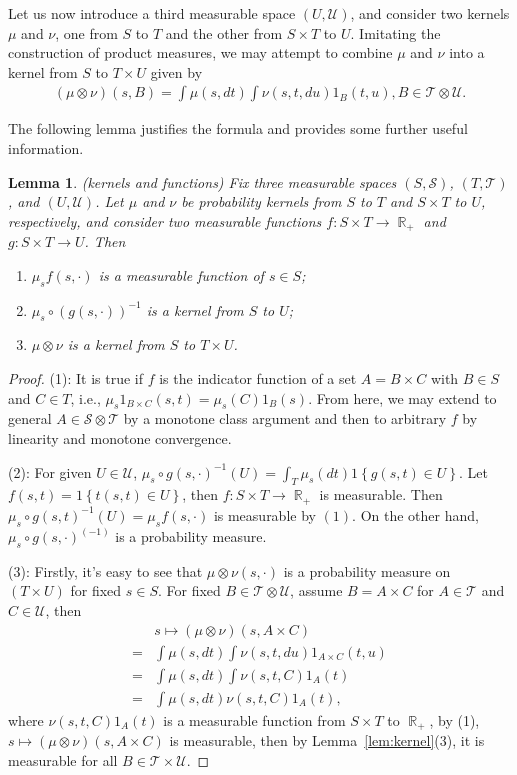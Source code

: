 \documentclass[12pt,a4paper]{article}
\newcommand{\R}{\mathop{\mathbb{R}}}
\def \U {\mathbf{U}}
\def \U {\mathcal{U}}
\def \S {\mathcal{S}}
\def \T {\mathcal{T}}
\newtheorem{lemma}[theorem]{Lemma}
\begin{document}
Let us now introduce a third measurable space $(U,\U)$, and consider two kernels $\mu$ and $\nu$, one from $S$ to $T$ and the other from $S\times T$ to $U$. Imitating the construction of product measures, we may attempt to combine $\mu$ and $\nu$ into a kernel from $S$ to $T\times U$ given by
\begin{align*}
  (\mu\otimes \nu)(s,B) = \int \mu(s,dt) \int \nu(s,t, du) 1_B(t,u), B \in \T\otimes \U.
\end{align*}

The following lemma justifies the formula and provides some further useful information.
\begin{lemma}
  (kernels and functions) Fix three measurable spaces $(S,\S)$, $(T,\T)$, and $(U,\U)$. Let $\mu$ and $\nu$ be probability kernels from $S$ to $T$ and $S\times T$ to $U$, respectively, and consider two measurable functions $f:S\times T\to \R_+$ and $g:S\times T\to U$. Then
  \begin{enumerate}
    \item $\mu_sf(s,\cdot)$ is a measurable function of $s\in S$;
    \item $\mu_s \circ (g(s,\cdot))^{-1}$ is a kernel from $S$ to $U$;
      \item $\mu\otimes \nu$ is a kernel from $S$ to $T\times U$.
  \end{enumerate}
  \label{lem:kernel&function}
\end{lemma}
\begin{proof}
  (1): It is true if $f $ is the indicator function of a set $A=B\times C$ with $B\in S$ and $C\in T$, i.e., $\mu_s 1_{B\times C}(s,t)= \mu_s(C) 1_B(s) $. From here, we may extend to general $A\in \S\otimes\T$ by a monotone class argument and then to arbitrary $f$ by linearity and monotone convergence.

  (2): For given $U\in \U$, $\mu_s\circ g(s,\cdot)^{-1}(U)= \int_T \mu_s(dt) 1\left\{ g(s,t)\in U \right\}$. Let $f(s,t) = 1\left\{ t(s,t)\in U \right\}$, then $f: S\times T\to \R_+$ is measurable. Then $\mu_s\circ g(s,t)^{-1}(U) = \mu_s f(s,\cdot)$ is measurable by $(1)$. On the other hand, $\mu_s\circ g(s,\cdot)^{(-1)}$ is a probability measure. 

  (3): Firstly, it's easy to see that $\mu\otimes \nu(s,\cdot)$ is a probability measure on $(T\times U)$ for fixed $s\in S$. 
  For fixed $B\in \T\otimes \U$, assume $B = A\times C$ for $A\in \T$ and $C\in \U$, then
\begin{align*}
  &s\mapsto (\mu\otimes \nu)(s,A\times C)\\
  = & \int \mu(s,dt) \int \nu(s,t,du) 1_{A\times C}(t,u) \\
  = & \int \mu(s,dt) \int \nu(s,t,C) 1_{A}(t) \\
  = & \int \mu(s,dt) \nu(s,t,C) 1_{A}(t),
\end{align*}
where $\nu(s,t,C) 1_{A}(t) $ is a measurable function from $S\times T$ to $\R_+$, by (1), $s\mapsto (\mu\otimes \nu)(s,A\times C)$ is measurable, then by Lemma~\ref{lem:kernel}(3), it is measurable for all $B \in \T\times \U$. 
\end{proof}
\end{document}
